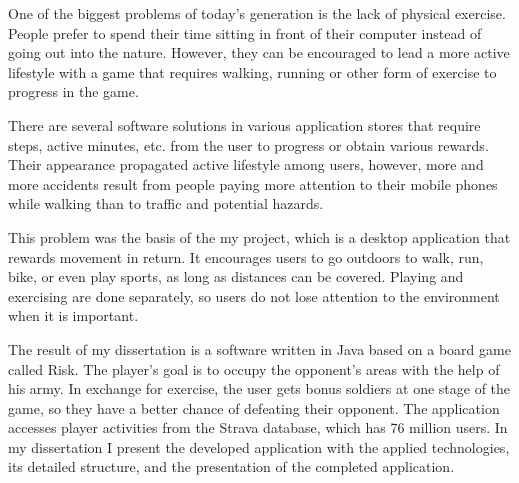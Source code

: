 One of the biggest problems of today’s generation is the lack of physical exercise.
People prefer to spend their time sitting in front of their computer instead of going out into the nature.
However, they can be encouraged to lead a more active lifestyle with a game that requires walking, running or other form of exercise to progress in the game.

There are several software solutions in various application stores that require steps, active minutes, etc. from the user to progress or obtain various rewards.
Their appearance propagated active lifestyle among users, however, more and more accidents result from people paying more attention to their mobile phones while walking than to traffic and potential hazards.

This problem was the basis of the my project, which is a desktop application that rewards movement in return.
It encourages users to go outdoors to walk, run, bike, or even play sports, as long as distances can be covered.
Playing and exercising are done separately, so users do not lose attention to the environment when it is important.

The result of my dissertation is a software written in Java based on a board game called Risk.
The player's goal is to occupy the opponent's areas with the help of his army.
In exchange for exercise, the user gets bonus soldiers at one stage of the game, so they have a better chance of defeating their opponent.
The application accesses player activities from the Strava database, which has 76 million users.
In my dissertation I present the developed application with the applied technologies, its detailed structure, and the presentation of the completed application.